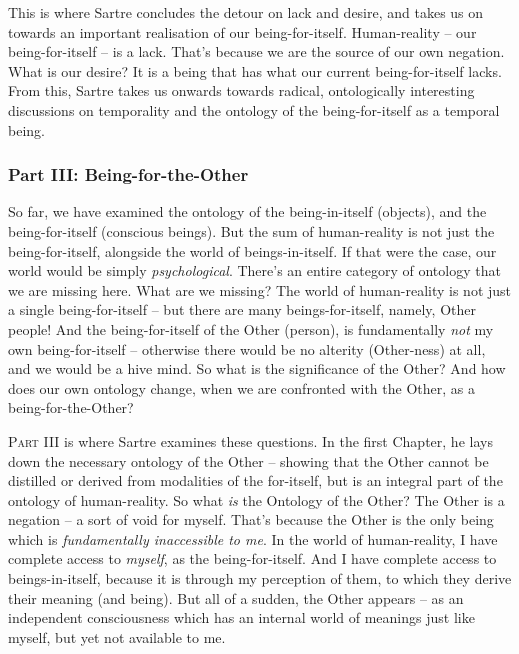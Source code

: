 This is where Sartre concludes the detour on lack and desire, and takes us on towards an important realisation of our being-for-itself. Human-reality -- our being-for-itself -- is a lack. That's because we are the source of our own negation. What is our desire? It is a being that has what our current being-for-itself lacks. From this, Sartre takes us onwards towards radical, ontologically interesting discussions on temporality and the ontology of the being-for-itself as a temporal being.

\subsubsection{Part III: Being-for-the-Other}

So far, we have examined the ontology of the being-in-itself (objects), and the being-for-itself (conscious beings). But the sum of human-reality is not just the being-for-itself, alongside the world of beings-in-itself. If that were the case, our world would be simply \emph{psychological}. There's an entire category of ontology that we are missing here. What are we missing? The world of human-reality is not just a single being-for-itself -- but there are many beings-for-itself, namely, Other people! And the being-for-itself of the Other (person), is fundamentally \emph{not} my own being-for-itself -- otherwise there would be no alterity (Other-ness) at all, and we would be a hive mind. So what is the significance of the Other? And how does our own ontology change, when we are confronted with the Other, as a being-for-the-Other?

\textsc{Part III} is where Sartre examines these questions. In the first Chapter, he lays down the necessary ontology of the Other -- showing that the Other cannot be distilled or derived from modalities of the for-itself, but is an integral part of the ontology of human-reality. So what \emph{is} the Ontology of the Other? The Other is a negation -- a sort of void for myself. That's because the Other is the only being which is \emph{fundamentally inaccessible to me}. In the world of human-reality, I have complete access to \emph{myself}, as the being-for-itself. And I have complete access to beings-in-itself, because it is through my perception of them, to which they derive their meaning (and being). But all of a sudden, the Other appears -- as an independent consciousness which has an internal world of meanings just like myself, but yet not available to me.  

